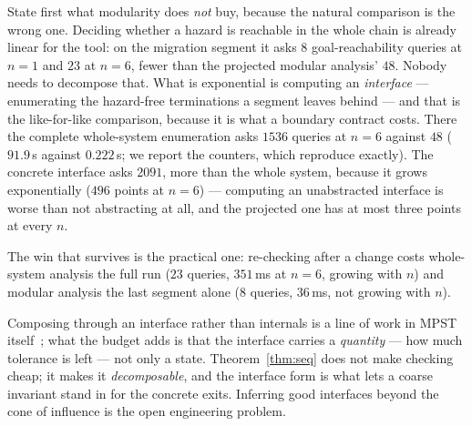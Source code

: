 \documentclass[a4paper,UKenglish,cleveref,autoref,thm-restate,anonymous]{lipics-v2021}
\begin{document}
State first what modularity does \emph{not} buy, because the natural comparison
is the wrong one. Deciding whether a hazard is reachable in the whole chain is
already linear for the tool: on the migration segment it asks $8$
goal-reachability queries at $n=1$ and $23$ at $n=6$, fewer than the projected
modular analysis' $48$. Nobody needs to decompose that. What is exponential is
computing an \emph{interface} --- enumerating the hazard-free terminations a
segment leaves behind --- and that is the like-for-like comparison, because it
is what a boundary contract costs. There the complete whole-system enumeration
asks $1536$ queries at $n=6$ against $48$ ($91.9$\,s against $0.222$\,s; we
report the counters, which reproduce exactly). The concrete interface asks
$2091$, more than the whole system, because it grows exponentially ($496$ points
at $n=6$) --- computing an unabstracted interface is worse than not abstracting
at all, and the projected one has at most three points at every $n$.

The win that survives is the practical one: re-checking after a change costs
whole-system analysis the full run ($23$ queries, $351$\,ms at $n=6$, growing
with $n$) and modular analysis the last segment alone ($8$ queries,
$36$\,ms, not growing with $n$).

\begin{table}[t]
\centering\small
{}
\caption{Chains of the migration segment, $k=2$. Re-check after replacing the
last segment: whole-system 28--351\,ms growing with $n$; modular 30--41\,ms,
not growing. The deployment segment gives the same shape at smaller scale
(2208\,ms vs 80\,ms at $n=6$).}
\label{tab:mod}
\end{table}

Composing through an interface rather than internals is a line of work in MPST
itself~\cite{gheri-oopsla23,barbanera-jlamp21}; what the budget adds is that the
interface carries a \emph{quantity} --- how much tolerance is left --- not only
a state. Theorem~\ref{thm:seq} does not make checking cheap; it makes it
\emph{decomposable}, and the interface form is what lets a coarse invariant
stand in for the concrete exits. Inferring good interfaces beyond the cone of
influence is the open engineering problem.
\end{document}

